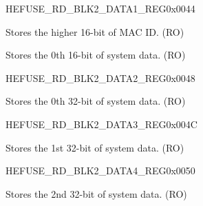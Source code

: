 \begin{register}{H}{EFUSE\_RD\_BLK2\_DATA1\_REG}{0x0044}\label{regdesc:EFUSERDBLK2DATA1REG}
%
%
\regnewline%
\begin{regdesc}\begin{reglist}
\label{fielddesc:EFUSEMACIDHIGH}\item [EFUSE\_MAC\_ID\_HIGH] Stores the higher 16-bit of MAC ID. (RO)
\label{fielddesc:EFUSESYSDATA0}\item [EFUSE\_SYS\_DATA0] Stores the 0th 16-bit of system data. (RO)
\end{reglist}\end{regdesc}
\end{register}


\begin{register}{H}{EFUSE\_RD\_BLK2\_DATA2\_REG}{0x0048}\label{regdesc:EFUSERDBLK2DATA2REG}
%
\regnewline%
\begin{regdesc}\begin{reglist}
\label{fielddesc:EFUSESYSDATA1}\item [EFUSE\_SYS\_DATA1] Stores the 0th 32-bit of system data. (RO)
\end{reglist}\end{regdesc}
\end{register}


\begin{register}{H}{EFUSE\_RD\_BLK2\_DATA3\_REG}{0x004C}\label{regdesc:EFUSERDBLK2DATA3REG}
%
\regnewline%
\begin{regdesc}\begin{reglist}
\label{fielddesc:EFUSESYSDATA2}\item [EFUSE\_SYS\_DATA2] Stores the 1st 32-bit of system data. (RO)
\end{reglist}\end{regdesc}
\end{register}


\begin{register}{H}{EFUSE\_RD\_BLK2\_DATA4\_REG}{0x0050}\label{regdesc:EFUSERDBLK2DATA4REG}
%
\regnewline%
\begin{regdesc}\begin{reglist}
\label{fielddesc:EFUSESYSDATA3}\item [EFUSE\_SYS\_DATA3] Stores the 2nd 32-bit of system data. (RO)
\end{reglist}\end{regdesc}
\end{register}


